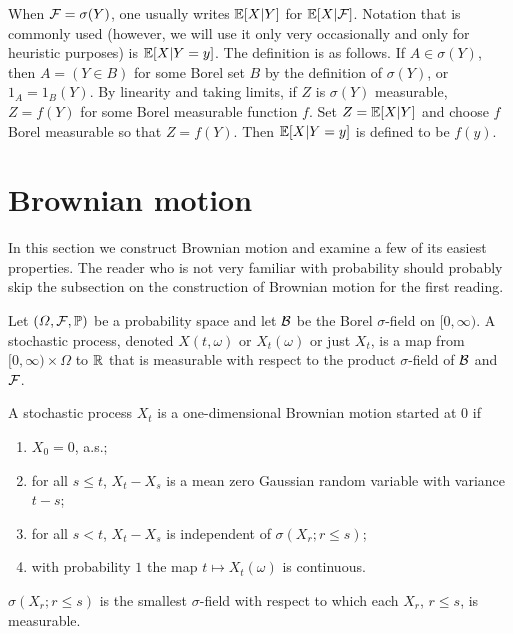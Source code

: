 \mpagebreak

When $\mathcal{F} = \sigma(Y)$, one usually writes $\mathbb{E}[X| Y]$ for $\mathbb{E}[X|\mathcal{F}]$. Notation that is commonly used (however, we will use it only very occasionally and only for heuristic purposes) is $\mathbb{E}[X| Y = y]$. The definition is as follows. If $A \in \sigma(Y)$, then $A = (Y \in B)$ for some Borel set $B$ by the definition of $\sigma(Y)$, or $1_A = 1_B(Y)$. By linearity and taking limits, if $Z$ is $\sigma(Y)$ measurable, $Z = f(Y)$ for some Borel measurable function $f$. Set $Z = \mathbb{E}[X| Y]$ and choose $f$ Borel measurable so that $Z = f(Y)$. Then $\mathbb{E}[X| Y = y]$ is defined to be $f(y)$.

\section{Brownian motion}\label{ch1_sec2}

In this section we construct Brownian motion and examine a few of its easiest properties. The reader who is not very familiar with probability should probably skip the subsection on the construction of Brownian motion for the first reading.


Let $(\varOmega, \mathcal{F}, \mathbb{P})$ be a probability space and let $\mathcal{B}$ be the Borel $\sigma$-field on $[0,\infty)$. A stochastic process, denoted $X(t,\omega)$ or $X_t(\omega)$ or just $X_t$, is a map from $[0,\infty) \times \Omega$ to $\mathbb{R}$ that is measurable with respect to the product $\sigma$-field of $\mathcal{B}$ and $\mathcal{F}$.

\begin{definition}\label{def:ch1_2.1}
A stochastic process $X_t$ is a one-dimensional Brownian motion started at $0$ if
\begin{enumerate}
    \item $X_0 = 0$, a.s.;
    \item for all $s \leq t$, $X_t - X_s$ is a mean zero Gaussian random variable with variance $t - s$;
    \item for all $s < t$, $X_t - X_s$ is independent of $\sigma(X_r; r \leq s)$;
    \item with probability $1$ the map $t \mapsto X_t(\omega)$ is continuous.
\end{enumerate}
\end{definition}

$\sigma(X_r; r \leq s)$ is the smallest $\sigma$-field with respect to which each $X_r$, $r \leq s$, is measurable.

